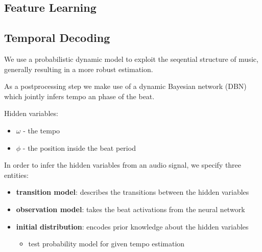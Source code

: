 \documentclass{scrartcl}
\begin{document}
\subsection{Feature Learning}



\subsection{Temporal Decoding}

We use a probabilistic dynamic model to exploit the seqential structure of music, generally resulting in a more robust estimation.

As a postprocessing step we make use of a dynamic Bayesian network (DBN) which jointly infers tempo an phase of the beat.

\vspace{1em}
Hidden variables: 
\begin{itemize}
\item $\omega$ - the tempo
\item $\phi$ - the position inside the beat period
\end{itemize}

\vspace{1em}
In order to infer the hidden variables from an audio signal, we specify three entities:

\begin{itemize}
\item \textbf{transition model}: describes the transitions between the hidden variables 
\item \textbf{observation model}: takes the beat activations from the neural network
\item \textbf{initial distribution}: encodes prior knowledge about the hidden variables
\begin{itemize}
\item test probability model for given tempo estimation 
\end{itemize}
\end{itemize}
\end{document}
